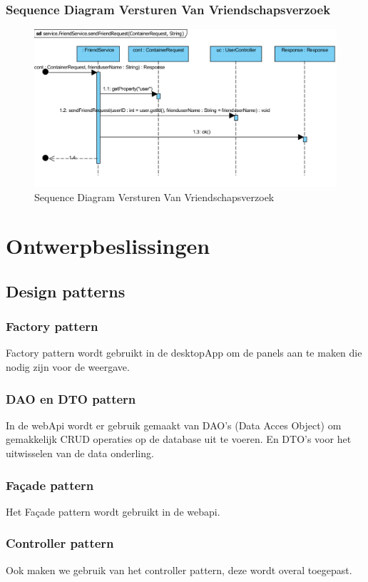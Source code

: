 \documentclass[pdftex,a4paper,12pt,twoside]{report}
\begin{document}
\subsection{Sequence Diagram Versturen Van Vriendschapsverzoek}
\begin{figure}[!htb]
\includegraphics[width=\textwidth]{images/sendfriendrequest.png}
\caption{Sequence Diagram Versturen Van Vriendschapsverzoek}
\end{figure}


\chapter{Ontwerpbeslissingen}
\section{Design patterns}
\subsection{Factory pattern}
Factory pattern wordt gebruikt in de desktopApp om de panels aan te maken die nodig zijn voor de weergave.

\subsection{DAO en DTO pattern}
In de webApi wordt er gebruik gemaakt van DAO's (Data Acces Object) om gemakkelijk CRUD operaties op de database uit te voeren. En DTO's voor het uitwisselen van de data onderling.

\subsection{Façade pattern}
Het Façade pattern wordt gebruikt in de webapi.

\subsection{Controller pattern}
Ook maken we gebruik van het controller pattern, deze wordt overal toegepast.
\end{document}
